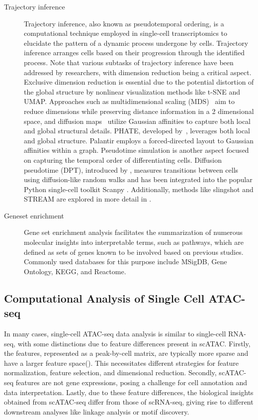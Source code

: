 \begin{description}
	\item[Trajectory inference] 
	Trajectory inference, also known as pseudotemporal ordering, is a computational technique employed in single-cell transcriptomics to elucidate the pattern of a dynamic process undergone by cells. Trajectory inference arranges cells based on their progression through the identified process. Note that various subtasks of trajectory inference have been addressed by researchers, with dimension reduction being a critical aspect. Exclusive dimension reduction is essential due to the potential distortion of the global structure by nonlinear visualization methods like t-SNE and UMAP. Approaches such as multidimensional scaling (MDS)~\citep{torgerson1952multidimensional} aim to reduce dimensions while preserving distance information in a 2 dimensional space, and diffusion maps~\citep{coifman2006diffusion} utilize Gaussian affinities to capture both local and global structural details. PHATE, developed by~\cite{moon2017phate}, leverages both local and global structure. Palantir employs a forced-directed layout to Gaussian affinities within a graph. Pseudotime simulation is another aspect focused on capturing the temporal order of differentiating cells. Diffusion pseudotime (DPT), introduced by \citep{haghverdi2016dpt}, measures transitions between cells using diffusion-like random walks and has been integrated into the popular Python single-cell toolkit Scanpy \citep{wolf2018scanpy}. Additionally, methods like slingshot\citep{street2018slingshot} and STREAM\citep{chen2019stream} are explored in more detail in .

	\item[Geneset enrichment] 
	Gene set enrichment analysis facilitates the summarization of numerous molecular insights into interpretable terms, such as pathways, which are defined as sets of genes known to be involved based on previous studies. Commonly used databases for this purpose include MSigDB, Gene Ontology, KEGG, and Reactome. 
\end{description}

\subsection{Computational Analysis of Single Cell ATAC-seq}
\label{background:sec2:scATAC}
In many cases, single-cell ATAC-seq data analysis is similar to single-cell RNA-seq, with some distinctions due to feature differences present in scATAC. Firstly, the features, represented as a peak-by-cell matrix, are typically more sparse and have a larger feature space(). This necessitates different strategies for feature normalization, feature selection, and dimensional reduction. Secondly, scATAC-seq features are not gene expressions, posing a challenge for cell annotation and data interpretation. Lastly, due to these feature differences, the biological insights obtained from scATAC-seq differ from those of scRNA-seq, giving rise to different downstream analyses like linkage analysis or motif discovery.

